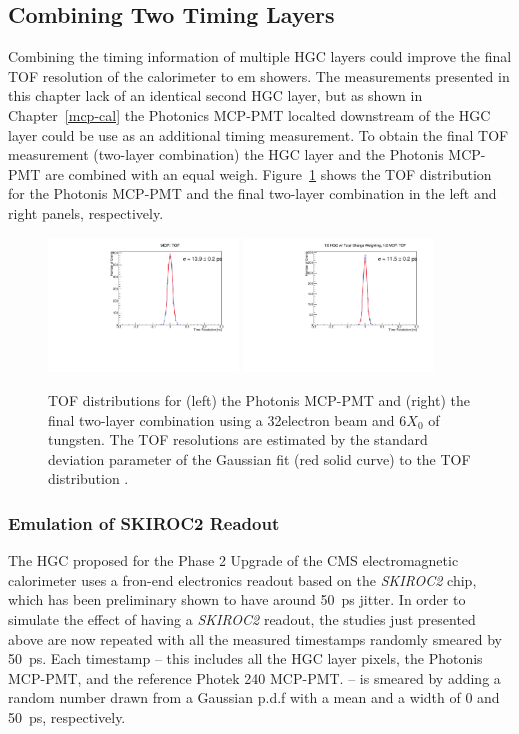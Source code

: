 \subsection{Combining Two Timing Layers}
Combining the timing information of multiple HGC layers could improve
the final TOF resolution of the calorimeter to em showers. The
measurements presented in this chapter lack of an identical second HGC layer, but as shown in
Chapter~\ref{mcp-cal} the Photonics MCP-PMT localted downstream of the HGC
layer could be use as an additional timing measurement. To obtain the
final TOF measurement (two-layer combination) the HGC layer and the
Photonis MCP-PMT are combined with an equal weigh. Figure~\ref{hgc:tofLong} shows the TOF distribution for the Photonis
MCP-PMT and the final two-layer combination in the left and right panels, respectively.
\begin{figure}[h] 
\centering
\includegraphics[width=0.45\textwidth]{HGC/deltaTMCP.pdf} 
\includegraphics[width=0.45\textwidth]{HGC/deltaT_PicoSilTotalCharge_MCP_Equal104.pdf} 
\caption{TOF distributions for (left) the Photonis MCP-PMT and (right)
  the final two-layer combination using a 32\GeV electron
  beam and 6$X_{0}$ of tungsten. The TOF resolutions are estimated by the
standard deviation parameter of the Gaussian fit (red solid curve) to the TOF distribution
.} 
\label{hgc:tofLong} 
\end{figure}

\subsubsection{Emulation of SKIROC2 Readout}
The HGC proposed for the Phase 2 Upgrade of the CMS electromagnetic
calorimeter uses a fron-end electronics readout based on the
\textit{SKIROC2} chip, which has been preliminary shown to have
around 50~ps jitter\cite{Butler:2020886}. In order to simulate the effect of having a
\textit{SKIROC2} readout, the studies just presented
above are now repeated with all the measured timestamps randomly
smeared by 50~ps. Each timestamp -- this includes all the  HGC
layer pixels, the Photonis MCP-PMT, and the reference Photek 240
MCP-PMT. -- is smeared by adding a random number
drawn from a Gaussian p.d.f with a mean and a width of 0 and 50~ps,
respectively. 


